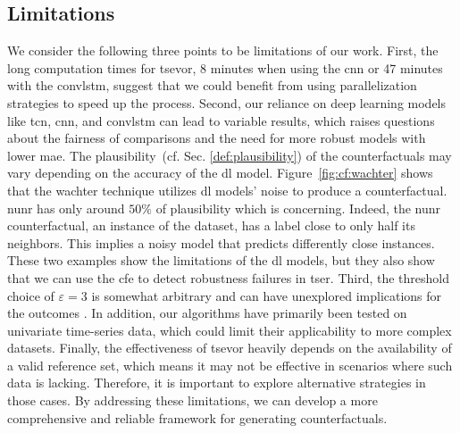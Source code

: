 \subsection{Limitations}
\label{sec:discussion:limit}
We consider the following three points to be limitations of our work.
First, the long computation times for \gls{tsevor}, 8 minutes when using the \gls{cnn} or 47 minutes with the \gls{convlstm}, suggest that we could benefit from using parallelization strategies to speed up the process. Second, our reliance on deep learning models like \gls{tcn}, \gls{cnn}, and \gls{convlstm} can lead to variable results, which raises questions about the fairness of comparisons and the need for more robust models \cite{hamman_robust_2024} with lower \gls{mae}. The plausibility~(cf. Sec. \ref{def:plausibility}) of the counterfactuals may vary depending on the accuracy of the \gls{dl} model.
Figure~\ref{fig:cf:wachter} shows that the \gls{wachter} technique utilizes \gls{dl} models' noise to produce a counterfactual. \gls{nunr} has only around $50\%$ of plausibility which is concerning. Indeed, the \gls{nunr} counterfactual, an instance of the dataset, has a label close to only half its neighbors. This implies a noisy model that predicts differently close instances. These two examples show the limitations of the \gls{dl} models, but they also show that we can use the \gls{cfe} to detect robustness failures in \gls{tser}.
Third, the threshold choice of $\varepsilon=3$ is somewhat arbitrary and can have unexplored implications for the outcomes \cite{spooner_counterfactual_2021}. In addition, our algorithms have primarily been tested on univariate time-series data, which could limit their applicability to more complex datasets. Finally, the effectiveness of \gls{tsevor} heavily depends on the availability of a valid reference set, which means it may not be effective in scenarios where such data is lacking. Therefore, it is important to explore alternative strategies in those cases. By addressing these limitations, we can develop a more comprehensive and reliable framework for generating counterfactuals.
